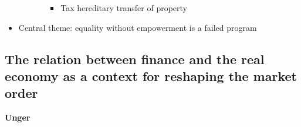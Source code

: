 \begin{itemize}
\begin{enumerate}
\begin{itemize}
      \begin{itemize}
      \tightlist
      \item
        Tax hereditary transfer of property
      \end{itemize}
    \end{itemize}
  \end{enumerate}
\item
  Central theme: equality without empowerment is a failed program
\end{itemize}

\hypertarget{the-relation-between-finance-and-the-real-economy-as-a-context-for-reshaping-the-market-order}{%
\subsection{The relation between finance and the real economy as a
context for reshaping the market
order}\label{the-relation-between-finance-and-the-real-economy-as-a-context-for-reshaping-the-market-order}}

\textbf{Unger}

